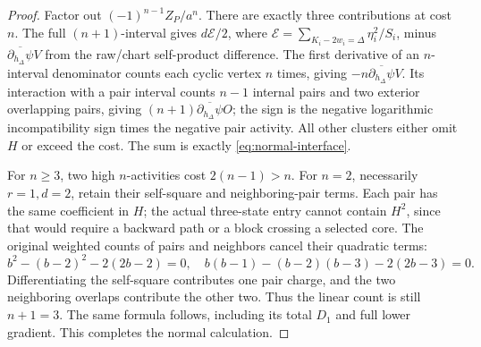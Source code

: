 \documentclass[11pt,a4paper]{amsart}
\numberwithin{equation}{section}
\theoremstyle{plain}
\theoremstyle{definition}
\begin{document}
\begin{proof}
Factor out \((-1)^{n-1}Z_P/a^n\).  There are exactly three contributions at cost \(n\).  The full \((n+1)\)-interval gives \(d\mathcal E/2\), where \(\mathcal E=\sum_{K_i-2w_i=\Delta}\eta_i^2/S_i\), minus \(\overline{\partial_{h_\Delta}\psi}V\) from the raw/chart self-product difference.  The first derivative of an \(n\)-interval denominator counts each cyclic vertex \(n\) times, giving \(-n\overline{\partial_{h_\Delta}\psi}V\).  Its interaction with a pair interval counts \(n-1\) internal pairs and two exterior overlapping pairs, giving \((n+1)\overline{\partial_{h_\Delta}\psi}O\); the sign is the negative logarithmic incompatibility sign times the negative pair activity.  All other clusters either omit \(H\) or exceed the cost.  The sum is exactly \eqref{eq:normal-interface}.

For \(n\ge3\), two high \(n\)-activities cost \(2(n-1)>n\).  For \(n=2\), necessarily \(r=1,d=2\), retain their self-square and neighboring-pair terms.  Each pair has the same coefficient in \(H\); the actual three-state entry cannot contain \(H^2\), since that would require a backward path or a block crossing a selected core.  The original weighted counts of pairs and neighbors cancel their quadratic terms:
\[
 b^2-(b-2)^2-2(2b-2)=0,\quad
 b(b-1)-(b-2)(b-3)-2(2b-3)=0.
\]
Differentiating the self-square contributes one pair charge, and the two neighboring overlaps contribute the other two.  Thus the linear count is still \(n+1=3\).  The same formula follows, including its total \(D_1\) and full lower gradient.  This completes the normal calculation.
\end{proof}
\end{document}
